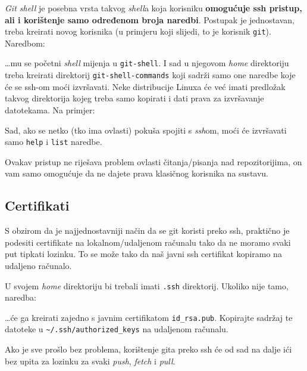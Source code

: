 \emph{Git shell} je posebna vrsta takvog \emph{shell}a koja korisniku \textbf{omogućuje ssh pristup, ali i korištenje samo određenom broja naredbi}.
Postupak je jednostavan, treba kreirati novog korisnika (u primjeru koji slijedi, to je korisnik \verb+git+).
Naredbom:


\dots{}mu se početni \emph{shell} mijenja u \verb+git-shell+.
I sad u njegovom \emph{home} direktoriju treba kreirati direktorij \verb+git-shell-commands+ koji sadrži samo one naredbe koje će se ssh-om moći izvršavati.
Neke distribucije Linuxa će već imati predložak takvog direktorija kojeg treba samo kopirati i dati prava za izvršavanje datotekama.
Na primjer:


Sad, ako se netko (tko ima ovlasti) pokuša spojiti s \emph{ssh}om, moći će izvršavati samo \verb+help+ i \verb+list+ naredbe.

Ovakav pristup ne riješava problem ovlasti čitanja/pisanja nad repozitorijima, on vam samo omogućuje da ne dajete prava klasičnog korisnika na sustavu.

\subsection*{Certifikati}

S obzirom da je najjednostavniji način da se git koristi preko ssh, praktično je podesiti certifikate na lokalnom/udaljenom računalu tako da ne moramo svaki put tipkati lozinku.
To se može tako da naš javni ssh certifikat kopiramo na udaljeno računalo.

U svojem \emph{home} direktoriju bi trebali imati \verb+.ssh+ direktorij.
Ukoliko nije tamo, naredba:


\dots{}će ga kreirati zajedno s javnim certifikatom \verb+id_rsa.pub+.
Kopirajte sadržaj te datoteke u \verb+~/.ssh/authorized_keys+ na udaljenom računalu.

Ako je sve prošlo bez problema, korištenje gita preko ssh će od sad na dalje ići bez upita za lozinku za svaki \emph{push}, \emph{fetch} i \emph{pull}.


